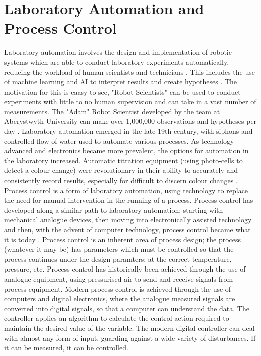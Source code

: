 \documentclass[twoside,a4]{report}
\def\br{\newline \newline \noindent}
\begin{document}
	\section{Laboratory Automation and Process Control} %
	Laboratory automation involves the design and implementation of robotic systems which are able to conduct laboratory experiments automatically, reducing the workload of human scientists and technicians \cite{backwhatisauto}. This includes the use of machine learning and AI to interpret results and create hypotheses \cite{backlitrevai, backbaconauto, backlabauto}. The motivation for this is eaasy to see, "Robot Scientists" can be used to conduct experiments with little to no human supervision and can take in a vast number of measurements. The "Adam" Robot Scientist developed by the team at Aberystwyth University can make over 1,000,000 observations and hypotheses per day \cite{backontorobsci}. \br
	Laboratory automation emerged in the late 19th century, with siphons and controlled flow of water used to automate various processes. As technology advanced and electronics became more prevalent, the options for automation in the laboratory increased. Automatic titration equipment (using photo-cells to detect a colour change) were revolutionary in their ability to accurately and consistently record results, especially for difficult to discern colour changes \cite{backlabautohisto}. \br
	Process control is a form of laboratory automation, using technology to replace the need for manual intervention in the running of a process. Process control has developed along a similar path to laboratory automation; starting with mechanical analogue devices, then moving into electronically assisted technology and then, with the advent of computer technology, process control became what it is today \cite{backautocontrolhisto}.
	Process control is an inherent area of process design; the process (whatever it may be) has parameters which must be controlled so that the process continues under the design paramters; at the correct temperature, pressure, etc. Process control has historically been achieved through the use of analogue equipment, using pressurised air to send and receive signals from process equipment. Modern process control is achieved through the use of computers and digital electronics, where the analogue measured signals are converted into digital signals, so that a computer can understand the data. The controller applies an algorithm to calculate the control action required to maintain the desired value of the variable. The modern digital controller can deal with almost any form of input, guarding against a wide variety of disturbances. If it can be measured, it can be controlled.\br
\end{document}

